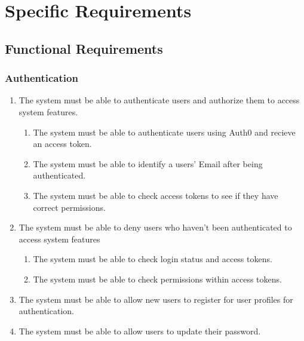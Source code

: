\documentclass[11pt]{article}
\begin{document}
\section{Specific Requirements}

\subsection{Functional Requirements} %

\subsubsection{Authentication}
\begin{enumerate}[label=R1.\arabic*.]
	\item The system must be able to authenticate users and authorize them to access system features.
	\begin{enumerate}[label*=\arabic*.]
		\item The system must be able to authenticate users using Auth0 and recieve an access token.
		\item The system must be able to identify a users' Email after being authenticated.
		\item The system must be able to check access tokens to see if they have correct permissions.
	\end{enumerate}
	\item The system must be able to deny users who haven't been authenticated to access system features
	\begin{enumerate}[label*=\arabic*.]
		\item The system must be able to check login status and access tokens.
		\item The system must be able to check permissions within access tokens.
	\end{enumerate}
	\item The system must be able to allow new users to register for user profiles for authentication.
	\item The system must be able to allow users to update their password.
\end{enumerate}
\end{document}
